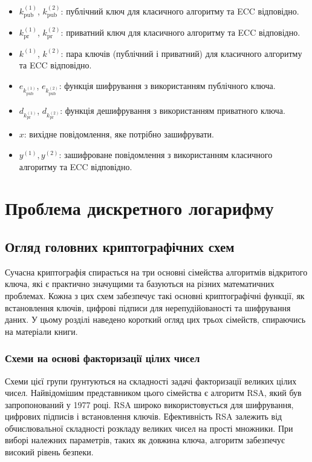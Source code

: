 \documentclass[12pt]{report}
\begin{document}
\begin{itemize}
    \item $k_{\text{pub}}^{(1)}$, $k_{\text{pub}}^{(2)}$: публічний ключ для класичного алгоритму та ECC відповідно.
    \item $k_{\text{pr}}^{(1)}$, $k_{\text{pr}}^{(2)}$: приватний ключ для класичного алгоритму та ECC відповідно.
    \item $k^{(1)}$, $k^{(2)}$: пара ключів (публічний і приватний) для класичного алгоритму та ECC відповідно.
    \item $e_{k_{\text{pub}}^{(1)}}$, $e_{k_{\text{pub}}^{(2)}}$: функція шифрування з використанням публічного ключа.
    \item $d_{k_{\text{pr}}^{(1)}}$, $d_{k_{\text{pr}}^{(2)}}$: функція дешифрування з використанням приватного ключа.
    \item $x$: вихідне повідомлення, яке потрібно зашифрувати.
    \item $y^{(1)}, y^{(2)}$: зашифроване повідомлення з використанням класичного алгоритму та ECC відповідно.
\end{itemize}

\chapter{Проблема дискретного логарифму}

\section{Огляд головних криптографічних схем}

Сучасна криптографія спирається на три основні сімейства алгоритмів відкритого ключа, які є практично значущими та базуються на різних математичних проблемах. Кожна з цих схем забезпечує такі основні криптографічні функції, як встановлення ключів, цифрові підписи для нерепудійованості та шифрування даних. У цьому розділі наведено короткий огляд цих трьох сімейств, спираючись на матеріали книги.

\subsection{Схеми на основі факторизації цілих чисел}

Схеми цієї групи ґрунтуються на складності задачі факторизації великих цілих чисел. Найвідомішим представником цього сімейства є алгоритм RSA, який був запропонований у 1977 році. RSA широко використовується для шифрування, цифрових підписів і встановлення ключів. Ефективність RSA залежить від обчислювальної складності розкладу великих чисел на прості множники. При виборі належних параметрів, таких як довжина ключа, алгоритм забезпечує високий рівень безпеки.
\end{document}
